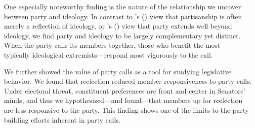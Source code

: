 \documentclass[12pt]{article}
\def\citeapos#1{\citeauthor{#1}'s (\citeyear{#1})} %
\begin{document}
One especially noteworthy finding is the nature of the relationship we uncover between party and ideology.  In contrast to \citeapos{Krehbiel:1993} view that partisanship is often merely a reflection of ideology, or \citeapos{Lee:2009} view that party extends well beyond ideology, we find party and ideology to be largely complementary yet distinct.  When the party calls its members together, those who benefit the most---typically ideological extremists---respond most vigorously to the call.

We further showed the value of party calls as a tool for studying legislative behavior.  We found that reelection reduced member responsiveness to party calls.  Under electoral threat, constituent preferences are front and center in Senators' minds, and thus we hypothesized---and found---that members up for reelection are less responsive to the party. This finding shows one of the limits to the party-building efforts inherent in party calls.


\end{document}
